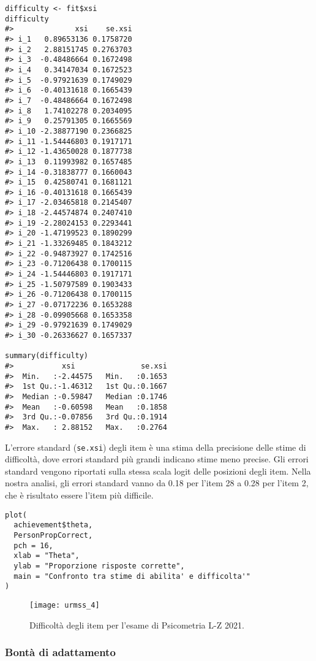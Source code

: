 \begin{lstlisting} 
difficulty <- fit$xsi
difficulty
#>              xsi    se.xsi
#> i_1   0.89653136 0.1758720
#> i_2   2.88151745 0.2763703
#> i_3  -0.48486664 0.1672498
#> i_4   0.34147034 0.1672523
#> i_5  -0.97921639 0.1749029
#> i_6  -0.40131618 0.1665439
#> i_7  -0.48486664 0.1672498
#> i_8   1.74102278 0.2034095
#> i_9   0.25791305 0.1665569
#> i_10 -2.38877190 0.2366825
#> i_11 -1.54446803 0.1917171
#> i_12 -1.43650028 0.1877738
#> i_13  0.11993982 0.1657485
#> i_14 -0.31838777 0.1660043
#> i_15  0.42580741 0.1681121
#> i_16 -0.40131618 0.1665439
#> i_17 -2.03465818 0.2145407
#> i_18 -2.44574874 0.2407410
#> i_19 -2.28024153 0.2293441
#> i_20 -1.47199523 0.1890299
#> i_21 -1.33269485 0.1843212
#> i_22 -0.94873927 0.1742516
#> i_23 -0.71206438 0.1700115
#> i_24 -1.54446803 0.1917171
#> i_25 -1.50797589 0.1903433
#> i_26 -0.71206438 0.1700115
#> i_27 -0.07172236 0.1653288
#> i_28 -0.09905668 0.1653358
#> i_29 -0.97921639 0.1749029
#> i_30 -0.26336627 0.1657337

summary(difficulty)
#>           xsi               se.xsi      
#>  Min.   :-2.44575   Min.   :0.1653  
#>  1st Qu.:-1.46312   1st Qu.:0.1667  
#>  Median :-0.59847   Median :0.1746  
#>  Mean   :-0.60598   Mean   :0.1858  
#>  3rd Qu.:-0.07856   3rd Qu.:0.1914  
#>  Max.   : 2.88152   Max.   :0.2764  
\end{lstlisting} 
L'errore standard (\texttt{se.xsi}) degli item è una stima della precisione delle stime di difficoltà, dove errori standard più grandi indicano stime meno precise. 
Gli errori standard vengono riportati sulla stessa scala logit delle posizioni degli item. 
Nella nostra analisi, gli errori standard vanno da 0.18 per l'item 28 a 0.28 per l'item 2, che è risultato essere l'item più difficile. 
\begin{lstlisting} 
plot(
  achievement$theta, 
  PersonPropCorrect,
  pch = 16,
  xlab = "Theta",
  ylab = "Proporzione risposte corrette",
  main = "Confronto tra stime di abilita' e difficolta'"
)
\end{lstlisting} 

\begin{figure}[h!]
  \begin{center}
    \texttt{[image: urmss\_4]}
    \caption{Difficoltà degli item per l'esame di Psicometria L-Z 2021.}
    \label{fig:urmss_4}
  \end{center}
\end{figure}

\subsubsection{Bontà di adattamento  }

